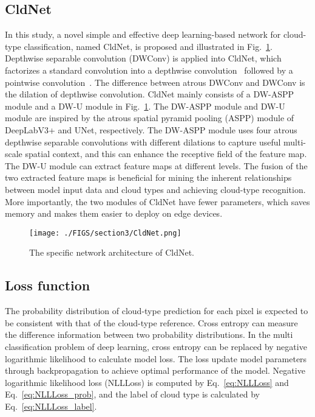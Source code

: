 \documentclass[review]{elsarticle}
\begin{document}
\subsection{CldNet}
\label{section:CldNet}
In this study, a novel simple and effective deep learning-based network for cloud-type classification, named CldNet, is proposed and illustrated in Fig.~\ref{fig:CldNet}.
Depthwise separable convolution (DWConv) is applied into CldNet, which factorizes a standard convolution into a depthwise convolution~\citep{Xception8099678} followed by a pointwise convolution~\citep{Pointwise8578207}.
The difference between atrous DWConv and DWConv is the dilation of depthwise convolution.
CldNet mainly consists of a DW-ASPP module and a DW-U module in Fig.~\ref{fig:CldNet}.
The DW-ASPP module and DW-U module are inspired by the atrous spatial pyramid pooling (ASPP) module of DeepLabV3+ and UNet, respectively.
The DW-ASPP module uses four atrous depthwise separable convolutions with different dilations to capture useful multi-scale spatial context, and this can enhance the receptive field of the feature map.
The DW-U module can extract feature maps at different levels.
The fusion of the two extracted feature maps is beneficial for mining the inherent relationships between model input data and cloud types and achieving cloud-type recognition.
More importantly, the two modules of CldNet have fewer parameters, which saves memory and makes them easier to deploy on edge devices.

\begin{figure}[!htp]
    \centering
    \texttt{[image: ./FIGS/section3/CldNet.png]}
    \caption{The specific network architecture of CldNet.}
    \label{fig:CldNet}
\end{figure}


\subsection{Loss function}
The probability distribution of cloud-type prediction for each pixel is expected to be consistent with that of the cloud-type reference.
Cross entropy can measure the difference information between two probability distributions.
In the multi classification problem of deep learning, cross entropy can be replaced by negative logarithmic likelihood to calculate model loss.
The loss update model parameters through backpropagation to achieve optimal performance of the model.
Negative logarithmic likelihood loss (NLLLoss) is computed by Eq.~\ref{eq:NLLLoss} and Eq.~\ref{eq:NLLLoss_prob}, and the label of cloud type is calculated by Eq.~\ref{eq:NLLLoss_label}.
\end{document}
